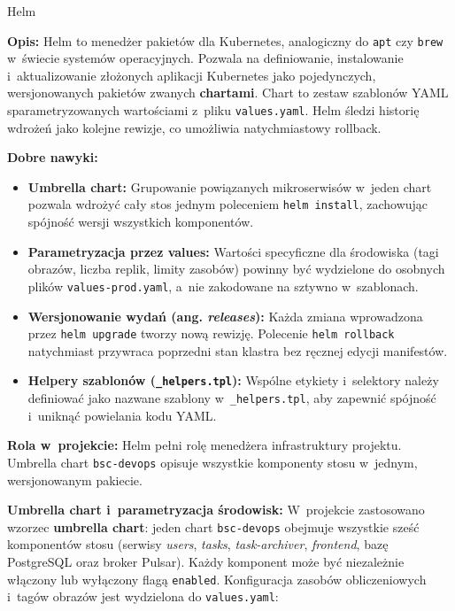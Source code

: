 \begin{techcard}{Helm}

\textbf{Opis:} Helm to menedżer pakietów dla Kubernetes, analogiczny do \texttt{apt} czy \texttt{brew} w~świecie systemów operacyjnych. Pozwala na definiowanie, instalowanie i~aktualizowanie złożonych aplikacji Kubernetes jako pojedynczych, wersjonowanych pakietów zwanych \textbf{chartami}. Chart to zestaw szablonów YAML sparametryzowanych wartościami z~pliku \texttt{values.yaml}. Helm śledzi historię wdrożeń jako kolejne rewizje, co umożliwia natychmiastowy rollback.

\textbf{Dobre nawyki:}
\begin{itemize}
  \item \textbf{Umbrella chart:} Grupowanie powiązanych mikroserwisów w~jeden chart pozwala wdrożyć cały stos jednym poleceniem \texttt{helm install}, zachowując spójność wersji wszystkich komponentów.
  \item \textbf{Parametryzacja przez values:} Wartości specyficzne dla środowiska (tagi obrazów, liczba replik, limity zasobów) powinny być wydzielone do osobnych plików \texttt{values-prod.yaml}, a~nie zakodowane na sztywno w~szablonach.
  \item \textbf{Wersjonowanie wydań (ang. \textit{releases}):} Każda zmiana wprowadzona przez \texttt{helm upgrade} tworzy nową rewizję. Polecenie \texttt{helm rollback} natychmiast przywraca poprzedni stan klastra bez ręcznej edycji manifestów.
  \item \textbf{Helpery szablonów (\texttt{\_helpers.tpl}):} Wspólne etykiety i~selektory należy definiować jako nazwane szablony w~\texttt{\_helpers.tpl}, aby zapewnić spójność i~uniknąć powielania kodu YAML.
\end{itemize}

\textbf{Rola w~projekcie:} Helm pełni rolę menedżera infrastruktury projektu. Umbrella chart \texttt{bsc-devops} opisuje wszystkie komponenty stosu w~jednym, wersjonowanym pakiecie.

\end{techcard}

\textbf{Umbrella chart i~parametryzacja środowisk:}
W~projekcie zastosowano wzorzec \textbf{umbrella chart}: jeden chart \texttt{bsc-devops} obejmuje wszystkie sześć komponentów stosu (serwisy \textit{users}, \textit{tasks}, \textit{task-archiver}, \textit{frontend}, bazę PostgreSQL oraz broker Pulsar). Każdy komponent może być niezależnie włączony lub wyłączony flagą \texttt{enabled}. Konfiguracja zasobów obliczeniowych i~tagów obrazów jest wydzielona do \texttt{values.yaml}:

